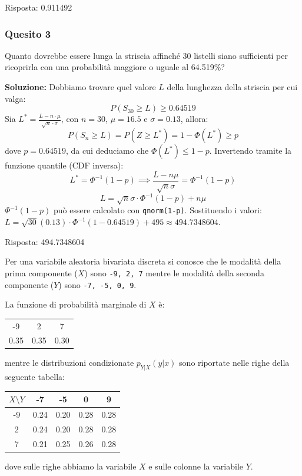 \documentclass[12pt, a4paper]{article}
\begin{document}
Risposta: 0.911492

\subsubsection*{Quesito 3}
Quanto dovrebbe essere lunga la striscia affinché 30 listelli siano sufficienti per ricoprirla con una probabilità maggiore o uguale al 64.519\%?

\textbf{Soluzione:}
Dobbiamo trovare quel valore $L$ della lunghezza della striscia per cui valga:
$$ P(S_{30} \geq L) \geq 0.64519 $$
Sia $L^* = \frac{L - n \cdot \mu}{\sqrt{n} \cdot \sigma}$, con $n=30$, $\mu=16.5$ e $\sigma=0.13$, allora:
$$ P(S_n \geq L) = P(Z \geq L^*) = 1 - \Phi(L^*) \geq p $$
dove $p=0.64519$, da cui deduciamo che $\Phi(L^*) \leq 1-p$. Invertendo tramite la funzione quantile (CDF inversa):
$$ L^* = \Phi^{-1}(1-p) \implies \frac{L - n\mu}{\sqrt{n}\sigma} = \Phi^{-1}(1-p) $$
$$ L = \sqrt{n}\sigma \cdot \Phi^{-1}(1-p) + n\mu $$
$\Phi^{-1}(1-p)$ può essere calcolato con \texttt{qnorm(1-p)}.
Sostituendo i valori: $L = \sqrt{30}(0.13) \cdot \Phi^{-1}(1 - 0.64519) + 495 \approx 494.7348604$.

Risposta: 494.7348604


\vspace{0.5cm}
\begin{tcolorbox}[colback=lightergray!10, colframe=tocsec, title=\textbf{Esercizio 7}]
Per una variabile aleatoria bivariata discreta si conosce che le modalità della prima componente ($X$) sono 
\texttt{-9, 2, 7} 
mentre le modalità della seconda componente ($Y$) sono 
\texttt{-7, -5, 0, 9}.

La funzione di probabilità marginale di $X$ è:
\begin{center}
\begin{tabular}{ccc}
\toprule
-9 & 2 & 7 \\
0.35 & 0.35 & 0.30 \\
\bottomrule
\end{tabular}
\end{center}

mentre le distribuzioni condizionate $p_{Y|X}(y|x)$ sono riportate nelle righe della seguente tabella:
\begin{center}
\begin{tabular}{c|cccc}
\toprule
$X \setminus Y$ & -7 & -5 & 0 & 9 \\
\midrule
-9 & 0.24 & 0.20 & 0.28 & 0.28 \\
2 & 0.24 & 0.20 & 0.28 & 0.28 \\
7 & 0.21 & 0.25 & 0.26 & 0.28 \\
\bottomrule
\end{tabular}
\end{center}
dove sulle righe abbiamo la variabile $X$ e sulle colonne la variabile $Y$.
\end{tcolorbox}
\end{document}
